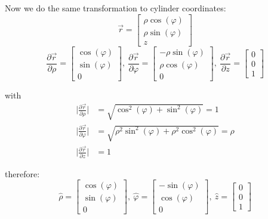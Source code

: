 \documentclass[11pt,a4paper]{article}
\begin{document}
\begin{enumerate}
Now we do the same transformation to cylinder coordinates:
\begin{equation*}
\vec{r}=
\begin{bmatrix}
\rho\cos(\varphi) \\
\rho\sin(\varphi) \\
z
\end{bmatrix}
\end{equation*}
\begin{equation*}
\frac{\partial\vec{r}}{\partial\rho}=
\begin{bmatrix}
\cos(\varphi) \\
\sin(\varphi) \\
0
\end{bmatrix},\ 
\frac{\partial\vec{r}}{\partial\varphi}=
\begin{bmatrix}
-\rho\sin(\varphi) \\
\rho\cos(\varphi) \\
0
\end{bmatrix},\ 
\frac{\partial\vec{r}}{\partial z}=
\begin{bmatrix}
0 \\
0 \\
1
\end{bmatrix}
\end{equation*}

with
\begin{align*}
\bigg|\frac{\partial\vec{r}}{\partial\rho}\bigg|&=\sqrt{\cos^2(\varphi)+\sin^2(\varphi)}=1 \\
\bigg|\frac{\partial\vec{r}}{\partial\varphi}\bigg|&=\sqrt{\rho^2\sin^2(\varphi)+\rho^2\cos^2(\varphi)}=\rho \\
\bigg|\frac{\partial\vec{r}}{\partial z}\bigg|&=1
\end{align*}

therefore:
\begin{equation*}
\hat{\rho}=
\begin{bmatrix}
\cos(\varphi) \\
\sin(\varphi) \\
0
\end{bmatrix},\
\hat{\varphi}=
\begin{bmatrix}
-\sin(\varphi) \\
\cos(\varphi) \\
0
\end{bmatrix},\
\hat{z}=
\begin{bmatrix}
0 \\
0 \\
1
\end{bmatrix}
\end{equation*}


\end{enumerate}
\end{document}
